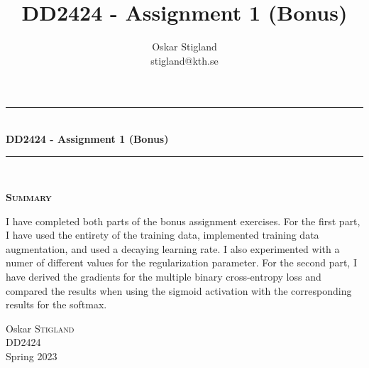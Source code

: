 \documentclass{article}
\title{DD2424 - Assignment 1 (Bonus)}
\author{Oskar Stigland \\ stigland@kth.se}
\begin{document}

	\begin{titlepage}
		\begin{center} 
			
			\rule{\linewidth}{0.5mm}\\[0.5 cm]
			{ \huge \bfseries DD2424 - Assignment 1 (Bonus)}\\[0.3 cm] %
			\rule{\linewidth}{0.5mm}\\[1 cm]
					
			\small\vfill
			\begin{center}
			\centering
			{\large \bfseries \textsc{Summary}}\\
			\vspace{1cm}
			\begin{minipage}{8cm}
				
				I have completed both parts of the bonus assignment exercises. For the first part, I have used the entirety of the training data, implemented training data augmentation, and used a decaying learning rate. I also experimented with a numer of different values for the regularization parameter. For the second part, I have derived the gradients for the multiple binary cross-entropy loss and compared the results when using the sigmoid activation with the corresponding results for the softmax.
			\end{minipage}
			\end{center}
			\large\vfill
						

		\end{center}	
		
		\begin{minipage}{0.4\textwidth}
			\begin{flushleft} \large
				Oskar \textsc{Stigland}\\
				DD2424\\
				Spring 2023
			\end{flushleft}
		\end{minipage}	

	\end{titlepage}

\newpage
\end{document}
